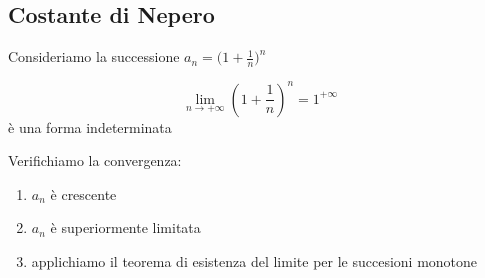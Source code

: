 \subsection{Costante di Nepero}

Consideriamo la successione $ a_{n} = \big(1+\frac{1}{n}\big)^n $

\[
  \lim_{n\to +\infty} (1+\frac{1}{n})^n =  1^{+\infty}
\] è una forma indeterminata

Verifichiamo la convergenza:
\begin{enumerate}
    \item $ a_{n}$ è crescente
    \item $ a_{n}$ è superiormente limitata
    \item applichiamo il teorema di esistenza del limite per le succesioni monotone
\end{enumerate}

